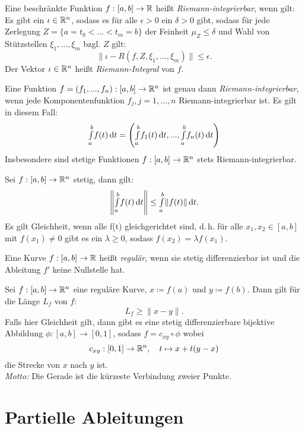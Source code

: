 \documentclass{cheat-sheet}
\begin{document}

\begin{defn} Eine beschränkte Funktion $f : [a, b] \to \mathbb{R}$ heißt \emph{Riemann-integrierbar}, wenn gilt: Es gibt ein $\iota \in \mathbb{R}^n$, sodass es für alle $\epsilon > 0$ ein $\delta > 0$ gibt, sodass für jede Zerlegung $Z = \{ a = t_0 < ... < t_m = b \}$ der Feinheit $\mu_Z \le \delta$ und Wahl von Stützstellen $\xi_1, ..., \xi_m$ bzgl. $Z$ gilt:
\[ \| \iota - R(f, Z, \xi_1, ..., \xi_m) \| \le \epsilon. \]
Der Vektor $\iota \in \mathbb{R}^n$ heißt \emph{Riemann-Integral} von $f$.
\end{defn}

\begin{bem}
Eine Funktion $f = (f_1, ..., f_n) : [a, b] \to \mathbb{R}^n$ ist genau dann \emph{Riemann-integrierbar}, wenn jede Komponentenfunktion $f_j, j = 1, ..., n$ Riemann-integrierbar ist. Es gilt in diesem Fall:
\[ {\textstyle \int\limits_{a}^{b}} f(t) \,\mathrm{d} t = \left( {\textstyle \int\limits_{a}^{b}} f_1(t) \,\mathrm{d} t, ..., {\textstyle \int\limits_{a}^{b}} f_n(t) \,\mathrm{d} t \right) \]
Insbesondere sind stetige Funktionen $f : [a, b] \to \mathbb{R}^n$ stets Riemann-integrierbar.
\end{bem}

\begin{satz}
Sei $f : [a, b] \to \mathbb{R}^n$ stetig, dann gilt:
\[ \left\| {\textstyle \int\limits_{a}^{b}} f(t) \,\mathrm{d} t \right\| \le {\textstyle \int\limits_{a}^{b}} \| f(t) \| \,\mathrm{d} t. \]
Es gilt Gleichheit, wenn alle f(t) gleichgerichtet sind, d.\,h. für alle $x_1, x_2 \in [a, b]$ mit $f(x_1) \not= 0$ gibt es ein $\lambda \ge 0$, sodass $f(x_2) = \lambda f(x_1)$.
\end{satz}

\begin{defn}
Eine Kurve $f : [a, b] \to \mathbb{R}$ heißt \emph{regulär}, wenn sie stetig differenzierbar ist und die Ableitung $f'$ keine Nullstelle hat.
\end{defn}

\begin{kor}
Sei $f : [a, b] \to \mathbb{R}^n$ eine reguläre Kurve, $x \coloneqq f(a)$ und $y \coloneqq f(b)$. Dann gilt für die Länge $L_f$ von $f$:
\[ L_f \ge \| x - y \|. \]
Falls hier Gleichheit gilt, dann gibt es eine stetig differenzierbare bijektive Abbildung $\phi : [a, b] \to [0, 1]$, sodass $f = c_{xy} \circ \phi$ wobei
\[ c_{xy} : [0, 1] \to \mathbb{R}^n,\quad t \mapsto x + t(y - x) \]
die Strecke von $x$ nach $y$ ist.\\
\textit{Motto:} Die Gerade ist die kürzeste Verbindung zweier Punkte.
\end{kor}


\section{Partielle Ableitungen}
\end{document}

